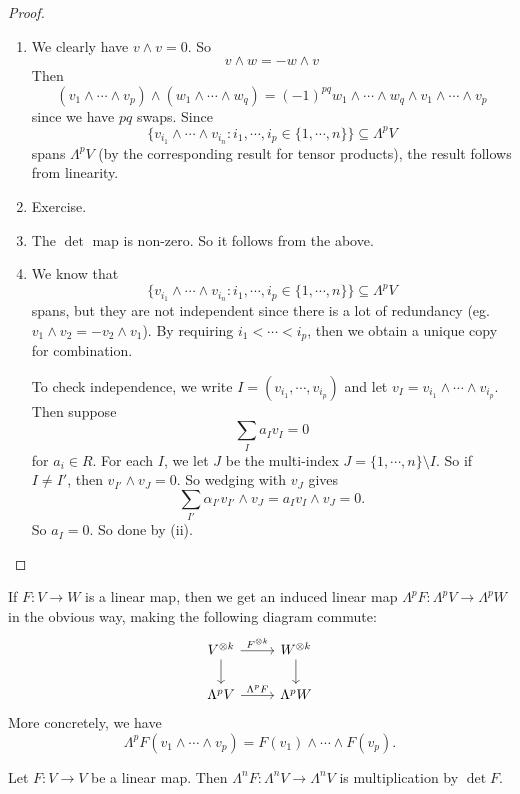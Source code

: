 \documentclass[a4paper]{article}
\begin{document}
\begin{proof}\leavevmode
  \begin{enumerate}
    \item We clearly have $v \wedge v = 0$. So
      \[
        v \wedge w = - w \wedge v
      \]
      Then
      \[
        (v_1 \wedge \cdots \wedge v_p) \wedge (w_1 \wedge \cdots \wedge w_q) = (-1)^{pq} w_1 \wedge \cdots \wedge w_q \wedge v_1 \wedge \cdots \wedge v_p
      \]
      since we have $pq$ swaps. Since
      \[
        \{v_{i_1} \wedge \cdots \wedge v_{i_n}: i_1, \cdots, i_p \in \{1,\cdots, n\}\} \subseteq \Lambda^p V
      \]
      spans $\Lambda^p V$ (by the corresponding result for tensor products), the result follows from linearity.
    \item Exercise.
    \item The $\det$ map is non-zero. So it follows from the above.
    \item We know that
      \[
        \{v_{i_1} \wedge \cdots \wedge v_{i_n}: i_1, \cdots, i_p \in \{1,\cdots, n\}\} \subseteq \Lambda^p V
      \]
      spans, but they are not independent since there is a lot of redundancy (eg. $v_1 \wedge v_2 = - v_2 \wedge v_1$). By requiring $i_1 < \cdots < i_p$, then we obtain a unique copy for combination.

      To check independence, we write $I = (v_{i_1}, \cdots, v_{i_p})$ and let $v_I = v_{i_1} \wedge \cdots \wedge v_{i_p}$. Then suppose
      \[
        \sum_I a_I v_I = 0
      \]
      for $a_i \in R$. For each $I$, we let $J$ be the multi-index $J = \{1, \cdots, n\} \setminus I$. So if $I \not= I'$, then $v_{I'} \wedge v_J = 0$. So wedging with $v_J$ gives
      \[
        \sum_{I'} \alpha_{I'} v_{I'} \wedge v_J = a_I v_I \wedge v_J = 0.
      \]
      So $a_I = 0$. So done by (ii).
  \end{enumerate}
\end{proof}

If $F: V \to W$ is a linear map, then we get an induced linear map $\Lambda^p F: \Lambda^p V \to \Lambda^p W$ in the obvious way, making the following diagram commute:
\[
  \begin{tikzcd}
    V^{\otimes k} \ar[r, "F^{\otimes k}"] \ar[d] & W^{\otimes k}\ar[d]\\
    \Lambda^p V \ar[r, "\Lambda^p F"] & \Lambda^p W
  \end{tikzcd}
\]
More concretely, we have
\[
  \Lambda^p F (v_1 \wedge \cdots \wedge v_p) = F(v_1) \wedge \cdots \wedge F(v_p).
\]
\begin{lemma}
  Let $F: V \to V$ be a linear map. Then $\Lambda^n F: \Lambda^n V \to \Lambda^n V$ is multiplication by $\det F$.
\end{lemma}
\end{document}
